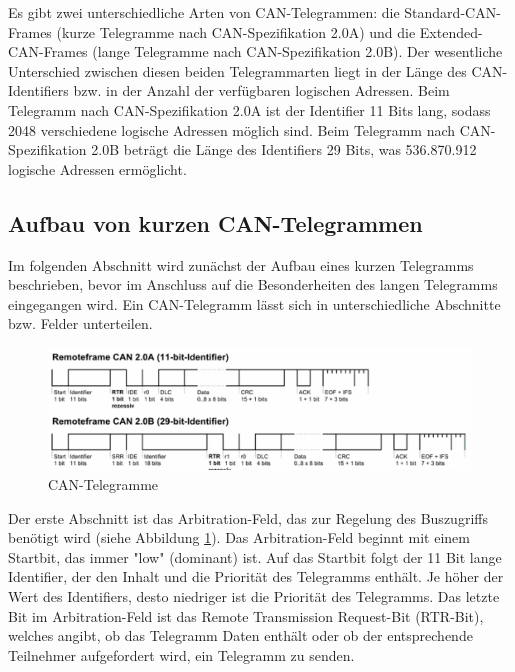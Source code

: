 Es gibt zwei unterschiedliche Arten von CAN-Telegrammen: die Standard-CAN-Frames (kurze Telegramme nach CAN-Spezifikation 2.0A) und die Extended-CAN-Frames (lange Telegramme nach CAN-Spezifikation 2.0B). Der wesentliche Unterschied zwischen diesen beiden Telegrammarten liegt in der Länge des CAN-Identifiers bzw. in der Anzahl der verfügbaren logischen Adressen. Beim Telegramm nach CAN-Spezifikation 2.0A ist der Identifier 11 Bits lang, sodass 2048 verschiedene logische Adressen möglich sind. Beim Telegramm nach CAN-Spezifikation 2.0B beträgt die Länge des Identifiers 29 Bits, was 536.870.912 logische Adressen ermöglicht. \cite{lawrenzCANControllerArea2016}

\subsection{Aufbau von kurzen CAN-Telegrammen}
Im folgenden Abschnitt wird zunächst der Aufbau eines kurzen Telegramms beschrieben, bevor im Anschluss auf die Besonderheiten des langen Telegramms eingegangen wird. Ein CAN-Telegramm lässt sich in unterschiedliche Abschnitte bzw. Felder unterteilen. 

    \begin{figure}[htbp]
    \centering
    \includegraphics[width=\Bildbreite]{Grafiken/CAN_Telegrame-crop.pdf}
    \caption{CAN-Telegramme \cite{lawrenzCANControllerArea2016}}
    \label{fig: CAN_Telegramme}
    \end{figure}    

Der erste Abschnitt ist das Arbitration-Feld, das zur Regelung des Buszugriffs benötigt wird (siehe Abbildung \ref{fig: CAN_Telegramme}).
Das Arbitration-Feld beginnt mit einem Startbit, das immer "low" (dominant) ist. Auf das Startbit folgt der 11 Bit lange Identifier, der den Inhalt und die Priorität des Telegramms enthält. Je höher der Wert des Identifiers, desto niedriger ist die Priorität des Telegramms. Das letzte Bit im Arbitration-Feld ist das Remote Transmission Request-Bit (RTR-Bit), welches angibt, ob das Telegramm Daten enthält oder ob der entsprechende Teilnehmer aufgefordert wird, ein Telegramm zu senden.

